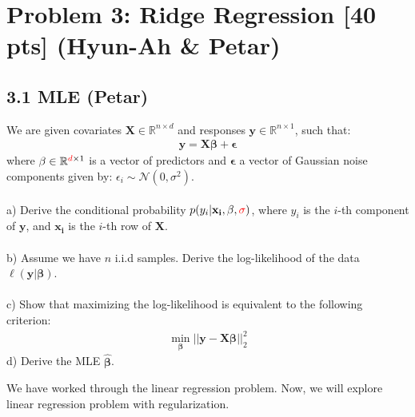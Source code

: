 \section*{Problem 3: Ridge Regression [40 pts] (Hyun-Ah \& Petar)}

\subsection* {3.1 MLE (Petar)}




We are given covariates $\mathbf{X} \in \mathbb{R}^{n \times d}$ and responses $\mathbf{y} \in \mathbb{R}^{n \times 1}$, such that: 
\begin{align}   
        \mathbf{y} = \mathbf{X}\mathbf{\beta} + \mathbf{\epsilon} 
\end{align} 
where $\mathbf{\beta} \in \mathbb{R}^{{\color{red}d} \times 1}$ is a vector of predictors and $\mathbf{\epsilon}$ a vector of Gaussian noise components given by: $\epsilon_i \sim \mathcal{N}(0, \sigma^2)$. \\ \\
a) Derive the conditional probability $p(y_i | \mathbf{x_i}, \mathbf{\beta}, {\color{red}\sigma})$, where $y_i$ is the $i$-th component of $\mathbf{y}$,  and $\mathbf{x_i}$ is the $i$-th row of $\mathbf{X}$. \\ \\ 
b) Assume we have $n$ i.i.d samples. Derive the log-likelihood of the data $\ell(\mathbf{y} | \mathbf{\beta})$. \\ \\ 
c) Show that maximizing the log-likelihood is equivalent to the following criterion: 
\begin{align} 
    \min_{\mathbf{\beta}} ||\mathbf{y} - \mathbf{X}\mathbf{\beta}||_2^2 
\end{align}
d) Derive the MLE $\hat{\mathbf{\beta}}$.


We have worked through the linear regression problem. Now, we will explore linear regression problem with regularization.

